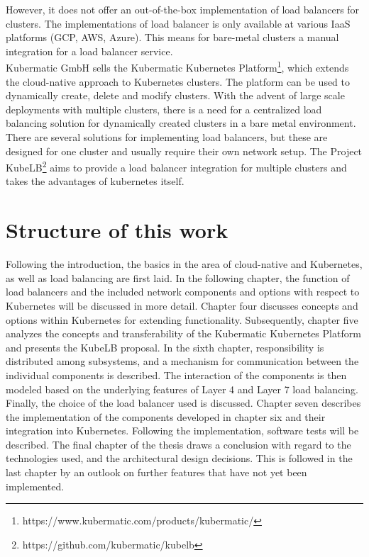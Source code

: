 However, it does not offer an out-of-the-box implementation of load balancers for clusters.
The implementations of load balancer is only available at various IaaS platforms (GCP, AWS, Azure).
This means for bare-metal clusters a manual integration for a load balancer service.
\\
Kubermatic GmbH sells the Kubermatic Kubernetes Platform\footnote{https://www.kubermatic.com/products/kubermatic/}, which extends the cloud-native approach to Kubernetes clusters.
The platform can be used to dynamically create, delete and modify clusters.
With the advent of large scale deployments with multiple clusters, there is a need for a centralized load balancing solution for dynamically created clusters in a bare metal environment.
There are several solutions for implementing load balancers, but these are designed for one cluster and usually require their own network setup.
The Project KubeLB\footnote{https://github.com/kubermatic/kubelb} aims to provide a load balancer integration for multiple clusters and takes the advantages of kubernetes itself.

\section{Structure of this work}
Following the introduction, the basics in the area of cloud-native and Kubernetes, as well as load balancing are first laid.
In the following chapter, the function of load balancers and the included network components and options with respect to Kubernetes will be discussed in more detail.
Chapter four discusses concepts and options within Kubernetes for extending functionality.
Subsequently, chapter five analyzes the concepts and transferability of the Kubermatic Kubernetes Platform and presents the KubeLB proposal.
In the sixth chapter, responsibility is distributed among subsystems, and a mechanism for communication between the individual components is described.
The interaction of the components is then modeled based on the underlying features of Layer 4 and Layer 7 load balancing.
Finally, the choice of the load balancer used is discussed.
Chapter seven describes the implementation of the components developed in chapter six and their integration into Kubernetes.
Following the implementation, software tests will be described.
The final chapter of the thesis draws a conclusion with regard to the technologies used, and the architectural design decisions.
This is followed in the last chapter by an outlook on further features that have not yet been implemented.
